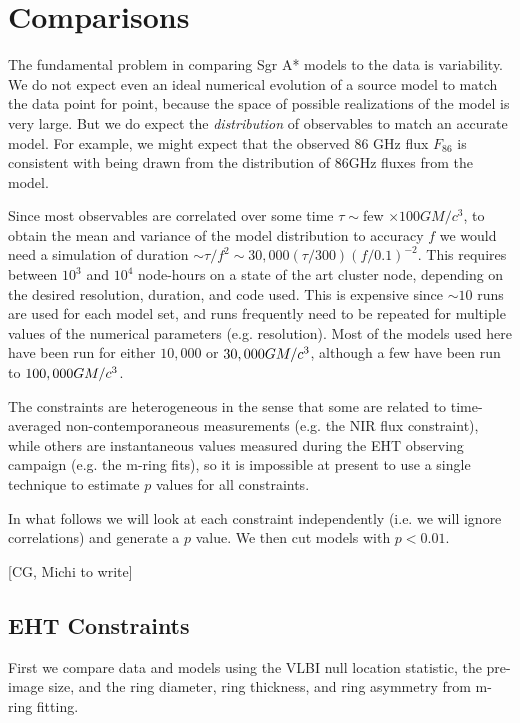 \section{Comparisons}\label{sec:comparisons}

The fundamental problem in comparing Sgr A* models to the data is variability.  We do not expect even an ideal numerical evolution of a source model to match the data point for point, because the space of possible realizations of the model is very large.  But we do expect the {\em distribution} of observables to match an accurate model.  For example, we might expect that the observed 86 GHz flux $F_{86}$ is consistent with being drawn from the distribution of 86GHz fluxes from the model.

Since most observables are correlated over some time $\tau \sim $few $\times 100 G M/c^3$, to obtain the mean and variance of the model distribution to accuracy $f$ we would need a simulation of duration $\sim \tau/f^2 \sim 30,000 (\tau/300) (f/0.1)^{-2}$.  This requires between $10^3$ and $10^4$ node-hours on a state of the art cluster node, depending on the desired resolution, duration, and code used.  This is expensive since $\sim 10$ runs are used for each model set, and runs frequently need to be repeated for multiple values of the numerical parameters (e.g. resolution).  Most of the models used here have been run for either $10,000$ or $30,000 G M/c^3$, although a few have been run to $100,000 G M/c^3$.   

The constraints are heterogeneous in the sense that some are related to time-averaged non-contemporaneous measurements (e.g. the NIR flux constraint), while others are instantaneous values measured during the EHT observing campaign (e.g. the m-ring fits), so it is impossible at present to use a single technique to estimate $p$ values for all constraints.

In what follows we will look at each constraint independently (i.e. we will ignore correlations) and generate a $p$ value.  We then cut models with $p < 0.01$.  

[CG, Michi to write] 

\subsection{EHT Constraints}

First we compare data and models using the VLBI null location statistic, the pre-image size, and the ring diameter, ring thickness, and ring asymmetry from m-ring fitting.  

